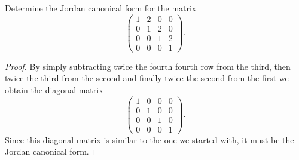 \documentclass[10pt]{amsart}
\begin{document}
\begin{thm}
  \label{Ex2}
  Determine the Jordan canonical form for the matrix
  $$
  \begin{pmatrix}
    1 & 2 & 0 & 0\\
    0 & 1 & 2 & 0\\
    0 & 0 & 1 & 2\\
    0 & 0 & 0 & 1
  \end{pmatrix}.
  $$
  \begin{proof}
    By simply subtracting twice the fourth fourth row from the third, then twice the third from the second and finally twice the second from the first we obtain the diagonal matrix
    $$
    \begin{pmatrix}
      1 & 0 & 0 & 0\\
      0 & 1 & 0 & 0\\
      0 & 0 & 1 & 0\\
      0 & 0 & 0 & 1
    \end{pmatrix}.
    $$
    Since this diagonal matrix is similar to the one we started with, it must be the Jordan canonical form.
  \end{proof}
\end{thm}
\end{document}
